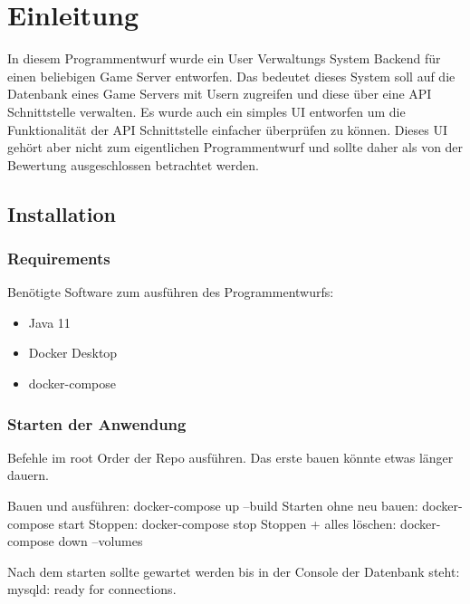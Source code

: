 \chapter{Einleitung}

In diesem Programmentwurf wurde ein User Verwaltungs System Backend für einen beliebigen Game Server entworfen.
Das bedeutet dieses System soll auf die Datenbank eines Game Servers mit Usern zugreifen und diese über eine API Schnittstelle verwalten.
Es wurde auch ein simples UI entworfen um die Funktionalität der API Schnittstelle einfacher überprüfen zu können.
Dieses UI gehört aber nicht zum eigentlichen Programmentwurf und sollte daher als von der Bewertung ausgeschlossen betrachtet werden.

\section{Installation}

\subsection{Requirements}

Benötigte Software zum ausführen des Programmentwurfs:

\begin{itemize}
    \item Java 11
    \item Docker Desktop
    \item docker-compose
\end{itemize}

\subsection{Starten der Anwendung}
Befehle im root Order der Repo ausführen.
Das erste bauen könnte etwas länger dauern.

Bauen und ausführen: docker-compose up --build
\newline
Starten ohne neu bauen: docker-compose start
\newline
Stoppen: docker-compose stop
\newline
Stoppen + alles löschen: docker-compose down --volumes
\newline

Nach dem starten sollte gewartet werden bis in der Console der Datenbank steht: mysqld: ready for connections.



